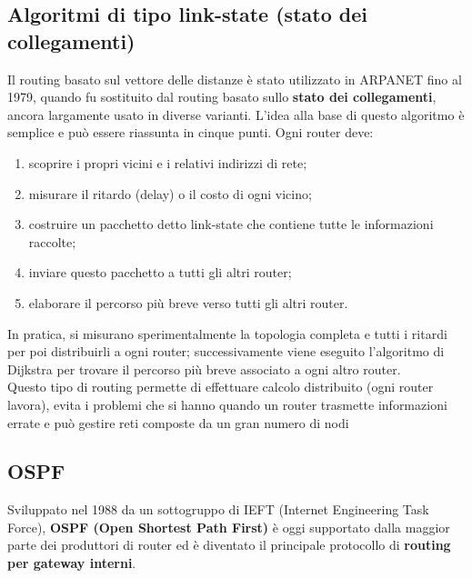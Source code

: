 \documentclass{article}
\begin{document}
        \subsection{Algoritmi di tipo link-state (stato dei collegamenti)}
        Il routing basato sul vettore delle distanze è stato utilizzato in ARPANET fino al 1979, quando
        fu sostituito dal routing basato sullo \textbf{stato dei collegamenti}, ancora largamente usato in
        diverse varianti. L’idea alla base di questo algoritmo è semplice e può essere riassunta in cinque
        punti. Ogni router deve:

        \begin{enumerate}
            \item scoprire i propri vicini e i relativi indirizzi di rete;
            \item misurare il ritardo (delay) o il costo di ogni vicino;
            \item costruire un pacchetto detto link-state che contiene tutte le informazioni raccolte;
            \item inviare questo pacchetto a tutti gli altri router;
            \item elaborare il percorso più breve verso tutti gli altri router.
        \end{enumerate}

        In pratica, si misurano sperimentalmente la topologia completa e tutti i ritardi per poi
        distribuirli a ogni router; successivamente viene eseguito l’algoritmo di Dijkstra per trovare il
        percorso più breve associato a ogni altro router.\\
        
        Questo tipo di routing permette di effettuare calcolo distribuito (ogni router lavora), evita i
        problemi che si hanno quando un router trasmette informazioni errate e può gestire reti
        composte da un gran numero di nodi

        \subsection{OSPF}
        Sviluppato nel 1988 da un sottogruppo di IEFT (Internet Engineering Task Force), \textbf{OSPF (Open
        Shortest Path First)} è oggi supportato dalla maggior parte dei produttori di router ed è
        diventato il principale protocollo di \textbf{routing per gateway interni}.\\
        
\end{document}
